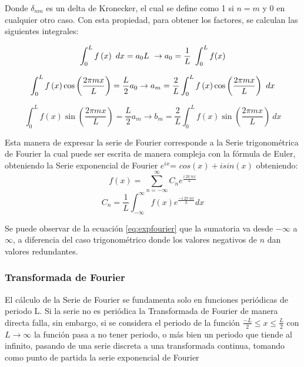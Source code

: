 			Donde $\delta_{nm}$ es un delta de Kronecker, el cual se define como 1 si $n=m$ y 0 en cualquier otro caso. Con esta propiedad, para obtener los factores, se calculan las siguientes integrales:
			
			\begin{equation}
				\centering
				\int_0^Lf\left(x\right)\ dx=a_0L\ \rightarrow{}a_0=\frac{1}{L}\ \int_0^Lf(x)
				\label{eq:obta0}
			\end{equation}
			
			\begin{equation}
				\centering
				\int_0^Lf\left(x\right)\cos{\left(\frac{2\pi{}mx}{L}\right)}=\frac{L}{2}a_0\rightarrow{}a_m=\frac{2}{L}\int_0^Lf\left(x\right)\cos{\left(\frac{2\pi{}mx}{L}\right)\ dx}
				\label{eq:obtam}
			\end{equation}
			
			\begin{equation}
				\int_0^Lf\left(x\right)\sin{\left(\frac{2\pi{}mx}{L}\right)}=\frac{L}{2}a_m\rightarrow{}b_m=\frac{2}{L}\int_0^Lf\left(x\right)\sin{\left(\frac{2\pi{}mx}{L}\right)\ dx}
				\label{eq:obtbm}
			\end{equation}
			
			Esta manera de expresar la serie de Fourier corresponde a la Serie trigonométrica de Fourier la cual puede ser escrita de manera compleja con la fórmula de Euler, obteniendo la Serie exponencial de Fourier $e^{ix} $= $cos(x) + i sin(x)$ obteniendo:
			\begin{equation}
				{f\left(x\right)=\ \sum_{n=-\infty{}}^{\infty{}}C_ne^{\frac{i\ 2\pi{}\ nx}{L}}}				
			\end{equation}
			\begin{equation}
				C_n=\frac{1}{L}\int_{-\infty{}}^{\infty{}}f(x)e^{\frac{-i\ 2\pi{}\
						nx}{L}}dx
				\label{eq:expfourier}
			\end{equation}
			
			Se puede observar de la ecuación \ref{eq:expfourier} que la sumatoria va desde $-\infty$  a $\infty$, a diferencia del caso trigonométrico donde los valores negativos de $n$ dan valores redundantes.
			
		\subsubsection{Transformada de Fourier}
		
			El cálculo de la Serie de Fourier se fundamenta solo en funciones periódicas de periodo L. Si la serie no es periódica la Transformada de Fourier de manera directa falla, sin embargo, si se considera el periodo de la función $\frac{-L}{2} \leq x \leq \frac{L}{2}$ con $ L \rightarrow \infty $  la función pasa a no tener periodo, o más bien un periodo que tiende al infinito, pasando de una serie discreta a una transformada continua, tomando como punto de partida la serie exponencial de Fourier
			
